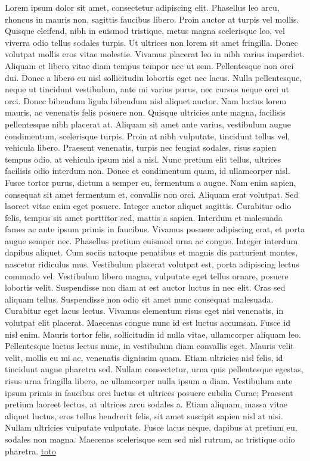 \documentclass{article}
\begin{document}
\pend
\pstart
Lorem ipsum dolor sit amet, consectetur adipiscing elit. Phasellus leo arcu, rhoncus in mauris non, sagittis faucibus libero. Proin auctor at turpis vel mollis. Quisque eleifend, nibh in euismod tristique, metus magna scelerisque leo, vel viverra odio tellus sodales turpis. Ut ultrices non lorem sit amet fringilla. Donec volutpat mollis eros vitae molestie. Vivamus placerat leo in nibh varius imperdiet. Aliquam et libero vitae diam tempus tempor nec ut sem.
\pend
\pstart
\hypertarget{$&33}{}Pellentesque non orci dui. Donec a libero eu nisl sollicitudin lobortis eget nec lacus. Nulla pellentesque, neque ut tincidunt vestibulum, ante mi varius purus, nec cursus neque orci ut orci. Donec bibendum ligula bibendum nisl aliquet auctor. Nam luctus lorem mauris, ac venenatis felis posuere non. Quisque ultricies ante magna, facilisis pellentesque nibh placerat at. Aliquam sit amet ante varius, vestibulum augue condimentum, scelerisque turpis. Proin at nibh vulputate, tincidunt tellus vel, vehicula libero. Praesent venenatis, turpis nec feugiat sodales, risus sapien tempus odio, at vehicula ipsum nisl a nisl. Nunc pretium elit tellus, ultrices facilisis odio interdum non. Donec et condimentum quam, id ullamcorper nisl.
\pend
\pstart
Fusce tortor purus, dictum a semper eu, fermentum a augue. Nam enim sapien, consequat sit amet fermentum et, convallis non orci. Aliquam erat volutpat. Sed laoreet vitae enim eget posuere. Integer auctor aliquet sagittis. Curabitur odio felis, tempus sit amet porttitor sed, mattis a sapien. Interdum et malesuada fames ac ante ipsum primis in faucibus. Vivamus posuere adipiscing erat, et porta augue semper nec.
\pend
\pstart
Phasellus pretium euismod urna ac congue. Integer interdum dapibus aliquet. Cum sociis natoque penatibus et magnis dis parturient montes, nascetur ridiculus mus. Vestibulum placerat volutpat est, porta adipiscing lectus commodo vel. Vestibulum libero magna, vulputate eget tellus ornare, posuere lobortis velit. Suspendisse non diam at est auctor luctus in nec elit. Cras sed aliquam tellus. Suspendisse non odio sit amet nunc consequat malesuada. Curabitur eget lacus lectus. Vivamus elementum risus eget nisi venenatis, in volutpat elit placerat. Maecenas congue nunc id est luctus accumsan. Fusce id nisl enim.
\pend
\pstart
Mauris tortor felis, sollicitudin id nulla vitae, ullamcorper aliquam leo. Pellentesque luctus lectus nunc, in vestibulum diam convallis eget. Mauris velit velit, mollis eu mi ac, venenatis dignissim quam. Etiam ultricies nisl felis, id tincidunt augue pharetra sed. Nullam consectetur, urna quis pellentesque egestas, risus urna fringilla libero, ac ullamcorper nulla ipsum a diam. Vestibulum ante ipsum primis in faucibus orci luctus et ultrices posuere cubilia Curae; Praesent pretium laoreet lectus, at ultrices arcu sodales a. Etiam aliquam, massa vitae aliquet luctus, eros tellus hendrerit felis, sit amet suscipit sapien nisl at nisi. Nullam ultricies vulputate vulputate. Fusce lacus neque, dapibus at pretium eu, sodales non magna. Maecenas scelerisque sem sed nisl rutrum, ac tristique odio pharetra.
\pend
\endnumbering
\printindex[issue115]
\hyperlink{$&33}{toto}
\end{document}
